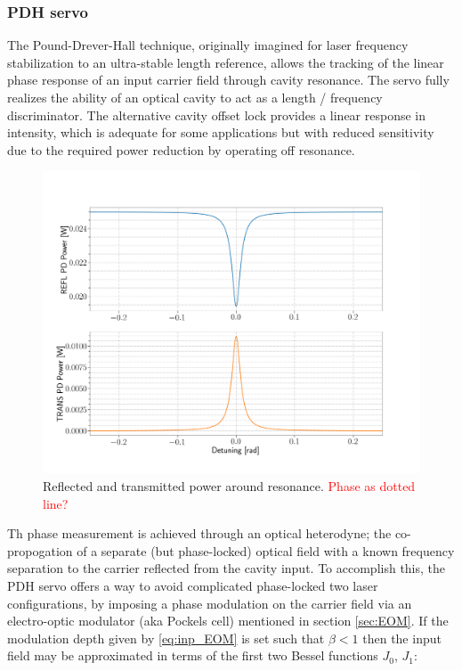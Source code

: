 \subsubsection{PDH servo}\label{subsubsec:pdh}
The Pound-Drever-Hall technique, originally imagined for laser frequency stabilization to an ultra-stable length reference, allows the tracking of the linear phase response of an input carrier field through cavity resonance. The servo fully realizes the ability of an optical cavity to act as a length / frequency discriminator. The alternative cavity offset lock provides a linear response in intensity, which is adequate for some applications but with reduced sensitivity due to the required power reduction by operating off resonance.
\begin{figure}[H]
\includegraphics[width=\textwidth]{figs/ALGAAS/DC_power_cav_resonance.png}
\caption{Reflected and transmitted power around resonance.
\textcolor{red}{Phase as dotted line?}}
\label{fig:cav_length_response_DCpow}
\end{figure}
Th phase measurement is achieved through an optical heterodyne; the co-propogation of a separate (but phase-locked) optical field with a known frequency separation to the carrier reflected from the cavity input. To accomplish this, the PDH servo offers a way to avoid complicated phase-locked two laser configurations, by imposing a phase modulation on the carrier field via an electro-optic modulator (aka Pockels cell) mentioned in section \ref{sec:EOM}. If the modulation depth given by \ref{eq:inp_EOM} is set such that $\beta < 1$ then the input field may be approximated in terms of the first two Bessel functions $J_0$, $J_1$:

